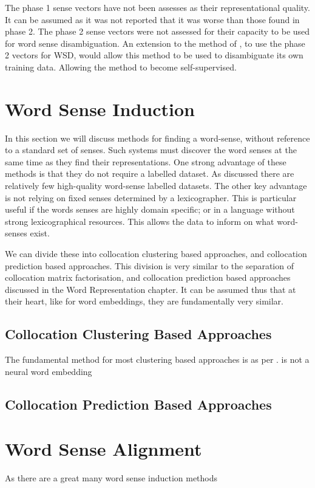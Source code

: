 \documentclass[12pt,parskip]{komatufte}
\begin{document}
The phase 1 sense vectors have not been assesses as their representational quality.
It can be assumed as it was not reported that it was worse than those found in phase 2.
The phase 2 sense vectors were not assessed for their capacity to be used for word sense disambiguation.
An extension to the method of \textcite{bibid}, to use the phase 2 vectors for WSD, would allow this method to be used to disambiguate its own training data. Allowing the method to become self-supervised.


\section{Word Sense Induction}
In this section we will discuss methods for finding a word-sense, without reference to a standard set of senses.
Such systems must discover the word senses at the same time as they find their representations.
One strong advantage of these methods is that they do not require a labelled dataset.
As discussed there are relatively few high-quality word-sense labelled datasets.
The other key advantage is not relying on fixed senses determined by a lexicographer.
This is particular useful if the words senses are highly domain specific;
or in a language without strong lexicographical resources.
This allows the data to inform on what word-senses exist.


We can divide these into collocation clustering based approaches,
and collocation prediction based approaches.
This division is very similar to the separation of collocation matrix factorisation,
and collocation prediction based approaches discussed in the Word Representation chapter.
It can be assumed thus that at their heart, like for word embeddings,
they are fundamentally very similar.


\subsection{Collocation Clustering Based Approaches}
The fundamental method for most clustering based approaches is as per .
\textcite{pantel2002WSI} is not a neural word embedding

\subsection{Collocation Prediction Based Approaches}



\section{Word Sense Alignment}
As there are a great many word sense induction methods
\end{document}
